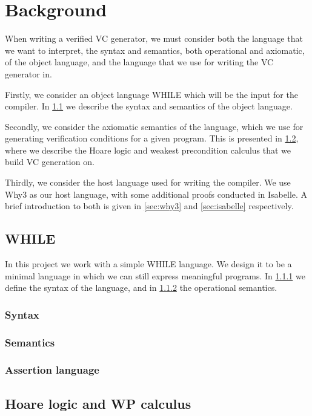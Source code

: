 \section{Background}
When writing a verified VC generator, we must consider both the language that we want to interpret, the syntax and semantics, both operational and axiomatic, of the object language, and the language that we use for writing the VC generator in.

Firstly, we consider an object language WHILE which will be the input for the compiler.
In \ref{sec:while} we describe the syntax and semantics of the object language.

Secondly, we consider the axiomatic semantics of the language, which we use for generating verification conditions for a given program. This is presented in \ref{sec:hoarewp}, where we describe the Hoare logic and weakest precondition calculus that we build VC generation on.

Thirdly, we consider the host language used for writing the compiler.
We use Why3 as our host language, with some additional proofs conducted in Isabelle. A brief introduction to both is given in \ref{sec:why3} and \ref{sec:isabelle} respectively.

\subsection{WHILE}\label{sec:while}
In this project we work with a simple WHILE language. We design it to be a minimal language in which we can still express meaningful programs.
In \ref{sec:syntax} we define the syntax of the language, and in \ref{sec:semantics} the operational semantics.

\subsubsection{Syntax}\label{sec:syntax}

\subsubsection{Semantics}\label{sec:semantics}


\subsubsection{Assertion language}\label{sec:assert}


\subsection{Hoare logic and WP calculus}\label{sec:hoarewp}

